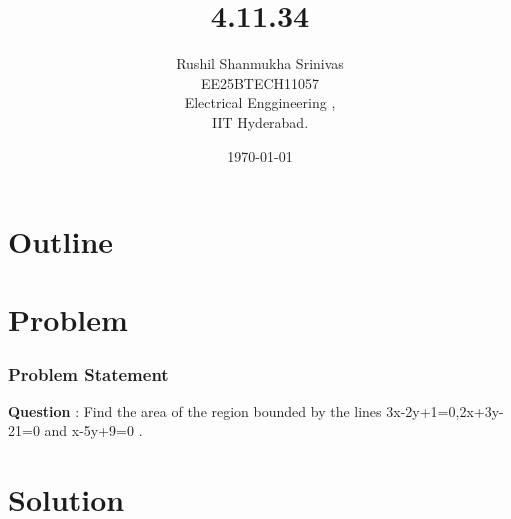 \documentclass{beamer}
\title{4.11.34}
\author{Rushil Shanmukha Srinivas \\EE25BTECH11057 \\ Electrical Enggineering ,\\IIT Hyderabad.}
\date{\today}
\theoremstyle{remark}
\numberwithin{equation}{section}
\begin{document}
 

\begin{frame}
\titlepage
\end{frame}

\section*{Outline}
\begin{frame}
\tableofcontents
\end{frame}
\section{Problem}
\begin{frame}
\frametitle{Problem Statement}
\textbf{Question} : Find the area of the region bounded by the lines 3x-2y+1=0,2x+3y-21=0 and x-5y+9=0 .

\end{frame}
\section{Solution}
\end{document}
